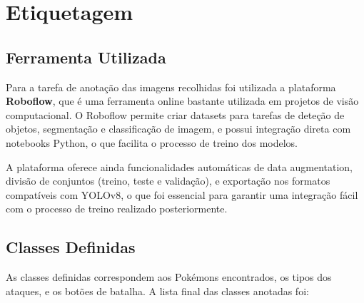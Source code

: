 \section{Etiquetagem} \label{etiquetagem}
\subsection{Ferramenta Utilizada}
Para a tarefa de anotação das imagens recolhidas foi utilizada a plataforma \textbf{Roboflow}, que é uma ferramenta online bastante utilizada em projetos de visão computacional. O Roboflow permite criar datasets para tarefas de deteção de objetos, segmentação e classificação de imagem, e possui integração direta com notebooks Python, o que facilita o processo de treino dos modelos.

A plataforma oferece ainda funcionalidades automáticas de data augmentation, divisão de conjuntos (treino, teste e validação), e exportação nos formatos compatíveis com YOLOv8, o que foi essencial para garantir uma integração fácil com o processo de treino realizado posteriormente.

\subsection{Classes Definidas}
As classes definidas correspondem aos Pokémons encontrados, os tipos dos ataques, e os botões de batalha. A lista final das classes anotadas foi:

